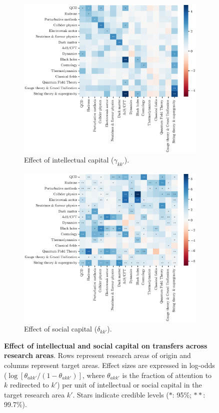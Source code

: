 \documentclass{article}
\begin{document}
\begin{figure}[h]
\hspace{-2em}
\begin{subfigure}{.5\textwidth}
    \includegraphics[width=1\textwidth]{Fig7a.eps}
    \caption{Effect of intellectual capital ($\gamma_{kk'}$).}
    \label{fig:intellectual-capital-effect}
\end{subfigure}%
\begin{subfigure}{.5\textwidth}
    \includegraphics[width=1\textwidth]{Fig7b.eps}
    \caption{Effect of social capital ($\delta_{kk'}$).}
    \label{fig:social-capital-effect}
\end{subfigure}
\caption{\textbf{Effect of intellectual and social capital on transfers across research areas}. Rows represent research areas of origin and columns represent target areas. Effect sizes are expressed in log-odds ($\log {[\theta_{akk'}/(1-\theta_{akk'})]}$, where $\theta_{akk'}$ is the fraction of attention to $k$ redirected to $k'$) per unit of intellectual or social capital in the target research area $k'$. Stars indicate credible levels ($\ast$: 95\%; $\ast\ast$: 99.7\%).}
\label{fig:test}
\end{figure}
\end{document}
